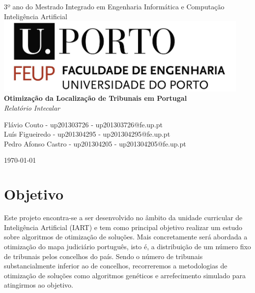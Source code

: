 \documentclass[11pt,a4paper,reqno]{article}
\numberwithin{equation}{section}
\begin{document}
\begin{titlepage}
\begin{center}

{\large 3º ano do Mestrado Integrado em Engenharia Informática e Computação \\[5mm]}
{\Large Inteligência Artificial}\\[3cm]

\includegraphics[width=12.5cm]{feup_logo.jpg}\\[3cm]

{\Huge \bfseries Otimização da Localização de Tribunais em Portugal \\[5mm]}
{\large \textit{Relatório Intecalar} \\[2cm]}


{\large Flávio Couto - up201303726 - up201303726@fe.up.pt\\[1mm]}
{\large Luís Figueiredo - up201304295 - up201304295@fe.up.pt \\[1mm]}
{\large Pedro Afonso Castro - up201304205 - up201304205@fe.up.pt\\[1cm]}


{\large \today}

\end{center}
\end{titlepage}

\tableofcontents



\newpage

\section{Objetivo}

Este projeto encontra-se a ser desenvolvido no âmbito da unidade curricular de Inteligência Artificial (IART) e tem como principal objetivo realizar um estudo sobre algoritmos de otimização de soluções. Mais concretamente será abordada a otimização do mapa judiciário português, isto é, a distribuição de um número fixo de tribunais pelos concelhos do país. Sendo o número de tribunais substancialmente inferior ao de concelhos, recorreremos a metodologias de otimização de soluções como algoritmos genéticos e arrefecimento simulado para atingirmos ao objetivo. 
\end{document}
